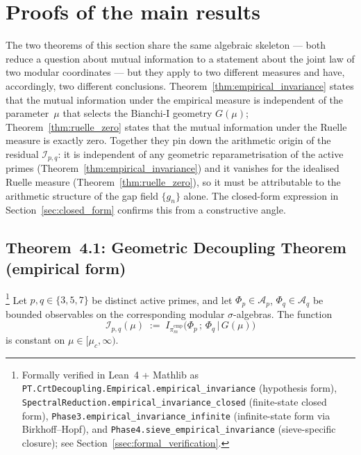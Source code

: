 \section{Proofs of the main results}
\label{sec:proofs}

The two theorems of this section share the same algebraic skeleton ---
both reduce a question about mutual information to a statement about
the joint law of two modular coordinates --- but they apply to two
different measures and have, accordingly, two different conclusions.
Theorem~\ref{thm:empirical_invariance} states that the mutual
information under the empirical measure is independent of the
parameter~$\mu$ that selects the Bianchi-I geometry $G(\mu)$;
Theorem~\ref{thm:ruelle_zero} states that the mutual information
under the Ruelle measure is exactly zero. Together they pin down the
arithmetic origin of the residual
$\mathcal{I}_{p,q}$: it is independent of any geometric reparametrisation
of the active primes (Theorem~\ref{thm:empirical_invariance}) and it
vanishes for the idealised Ruelle measure
(Theorem~\ref{thm:ruelle_zero}), so it must be attributable to the
arithmetic structure of the gap field $\{g_n\}$ alone. The closed-form
expression in Section~\ref{sec:closed_form} confirms this from a
constructive angle.

\subsection{Theorem~4.1: Geometric Decoupling Theorem (empirical form)}
\label{ssec:thm_4_1_proof}

\begin{theorem}
\label{thm:empirical_invariance}
\footnote{Formally verified in Lean~4 + Mathlib as
\texttt{PT.CrtDecoupling.Empirical.empirical\_invariance}
(hypothesis form),
\texttt{SpectralReduction.empirical\_invariance\_closed}
(finite-state closed form),
\texttt{Phase3.empirical\_invariance\_infinite}
(infinite-state form via Birkhoff--Hopf), and
\texttt{Phase4.sieve\_empirical\_invariance}
(sieve-specific closure); see Section~\ref{ssec:formal_verification}.}
Let $p, q \in \{3, 5, 7\}$ be distinct active primes, and let
$\Phi_p \in \mathcal{A}_p$, $\Phi_q \in \mathcal{A}_q$ be bounded
observables on the corresponding modular $\sigma$-algebras. The
function
\begin{equation}
  \mathcal{I}_{p,q}(\mu)
  \;:=\;
  I_{\pi_m^{\mathrm{emp}}}\!\bigl(\Phi_p \,;\, \Phi_q \,\big|\, G(\mu)\bigr)
  \label{eq:Ipq_def}
\end{equation}
is constant on $\mu \in [\mu_c, \infty)$.
\end{theorem}

